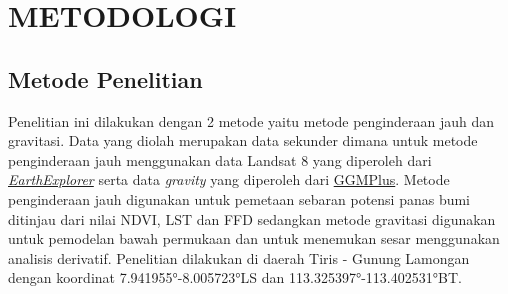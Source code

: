 \chapter{METODOLOGI}
\section{Metode Penelitian}
\hspace{25pt} Penelitian ini dilakukan dengan 2 metode yaitu metode penginderaan jauh dan gravitasi. Data yang diolah merupakan data sekunder dimana untuk metode penginderaan jauh menggunakan data Landsat 8 yang diperoleh dari \href{https://earthexplorer.usgs.gov/}{\textit{EarthExplorer}} serta data \textit{gravity} yang diperoleh dari \href{https://ddfe.curtin.edu.au/models/GGMplus/}{GGMPlus}. Metode penginderaan jauh digunakan untuk pemetaan sebaran potensi panas bumi ditinjau dari nilai NDVI, LST dan FFD sedangkan metode gravitasi digunakan untuk pemodelan bawah permukaan dan untuk menemukan sesar menggunakan analisis derivatif. Penelitian dilakukan di daerah Tiris - Gunung Lamongan dengan koordinat 7.941955°-8.005723°LS dan 113.325397°-113.402531°BT.

